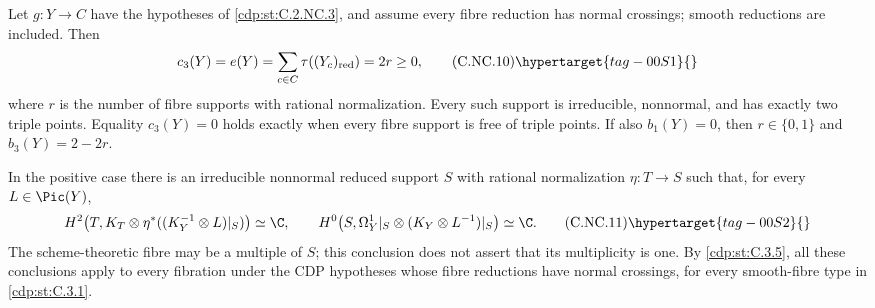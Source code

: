 \begin{proposition}\hypertarget{tag-01CC}{}\label{cdp:st:C.2.NC.5}


Let $g:Y\to C$ have the hypotheses of \ref{cdp:st:C.2.NC.3}, and assume every fibre reduction has normal crossings; smooth reductions are included. Then
\[
 c_3(Y)=e(Y)=\sum_{c\in C}\tau((Y_c)_{\rm red})=2r\ge0,
 \tag{C.NC.10}\hypertarget{tag-00S1}{}\label{cdp:eq:C.NC.10}
\]
where $r$ is the number of fibre supports with rational normalization. Every such support is irreducible, nonnormal, and has exactly two triple points. Equality $c_3(Y)=0$ holds exactly when every fibre support is free of triple points. If also $b_1(Y)=0$, then $r\in\{0,1\}$ and $b_3(Y)=2-2r$.

In the positive case there is an irreducible nonnormal reduced support $S$ with rational normalization $\eta:T\to S$ such that, for every $L\in\Pic(Y)$,
\[
 H^2\!\left(T,K_T\otimes\eta^*((K_Y^{-1}\otimes L)|_S)\right)\simeq\C,
 \qquad
 H^0\!\left(S,\Omega_Y^1|_S\otimes(K_Y\otimes L^{-1})|_S\right)\simeq\C.
 \tag{C.NC.11}\hypertarget{tag-00S2}{}\label{cdp:eq:C.NC.11}
\]
The scheme-theoretic fibre may be a multiple of $S$; this conclusion does not assert that its multiplicity is one. By \ref{cdp:st:C.3.5}, all these conclusions apply to every fibration under the CDP hypotheses whose fibre reductions have normal crossings, for every smooth-fibre type in \ref{cdp:st:C.3.1}.
\end{proposition}
